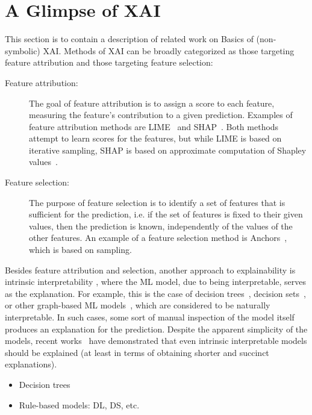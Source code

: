 \section{A  Glimpse of XAI} \label{sec:glimpsexai}

This section is to contain a description of related work on 
Basics of (non-symbolic) XAI.
%
Methods of XAI can be broadly categorized as those targeting feature
attribution and those targeting feature selection:

\begin{description} 
\item[Feature attribution:] %
%
The goal of feature attribution is to assign a score to each feature, 
measuring the feature's contribution to a given prediction. 
Examples of feature attribution methods are
LIME~\cite{guestrin-kdd16} and SHAP~\cite{lundberg-nips17}. 
Both methods attempt to learn scores for the features, 
but while LIME is based on iterative sampling, SHAP is based on
approximate computation of Shapley values~\cite{shapley53}. 
%

\item[Feature selection:]
The purpose of feature selection is to identify a set of features
that is sufficient for the prediction, i.e. if the set of features is fixed to their
given values, then the prediction is known, independently of the values of the
other features. An example of a feature selection method is Anchors~\cite{guestrin-aaai18},
which is based on sampling.
\end{description}


%
Besides feature attribution and selection, another approach to explainability 
is intrinsic interpretability \cite{rudin-naturemi19,molnar-bk20,rudin-ss22}, 
where the ML model, due to being interpretable, serves as the explanation. 
%
For example, this is the case of decision trees~\cite{breiman-ss01}, 
decision sets~\cite{leskovec-kdd16}, or other graph-based ML models~\cite{HuangII021}, 
which are considered to be naturally interpretable. 
In such cases, some sort of manual inspection of the model itself produces 
an explanation for the prediction.
%
Despite the apparent simplicity of the models, recent 
works~\cite{IzzaIM22,MarquesSilvaI23} have
demonstrated that even intrinsic interpretable models should be explained
(at least in terms of obtaining shorter and succinct explanations).

\begin{itemize}
\item Decision trees
\item Rule-based models: DL, DS, etc.
\end{itemize}
